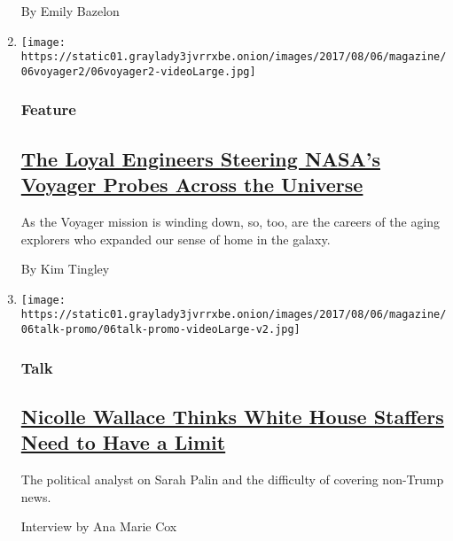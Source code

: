 \begin{enumerate}
  By Emily Bazelon
\item
  \texttt{[image: https://static01.graylady3jvrrxbe.onion/images/2017/08/06/magazine/06voyager2/06voyager2-videoLarge.jpg]}

  \hypertarget{feature-2}{%
  \subsubsection{Feature}\label{feature-2}}

  \hypertarget{the-loyal-engineers-steering-nasas-voyager-probes-across-the-universe}{%
  \subsection{\texorpdfstring{\href{/2017/08/03/magazine/the-loyal-engineers-steering-nasas-voyager-probes-across-the-universe.html}{The
  Loyal Engineers Steering NASA's Voyager Probes Across the
  Universe}}{The Loyal Engineers Steering NASA's Voyager Probes Across the Universe}}\label{the-loyal-engineers-steering-nasas-voyager-probes-across-the-universe}}

  As the Voyager mission is winding down, so, too, are the careers of
  the aging explorers who expanded our sense of home in the galaxy.

  By Kim Tingley
\item
  \texttt{[image: https://static01.graylady3jvrrxbe.onion/images/2017/08/06/magazine/06talk-promo/06talk-promo-videoLarge-v2.jpg]}

  \hypertarget{talk}{%
  \subsubsection{Talk}\label{talk}}

  \hypertarget{nicolle-wallace-thinks-white-house-staffers-need-to-have-a-limit}{%
  \subsection{\texorpdfstring{\href{/2017/08/02/magazine/nicolle-wallace-thinks-white-house-staffers-need-to-have-a-limit.html}{Nicolle
  Wallace Thinks White House Staffers Need to Have a
  Limit}}{Nicolle Wallace Thinks White House Staffers Need to Have a Limit}}\label{nicolle-wallace-thinks-white-house-staffers-need-to-have-a-limit}}

  The political analyst on Sarah Palin and the difficulty of covering
  non-Trump news.

  Interview by Ana Marie Cox
\end{enumerate}

